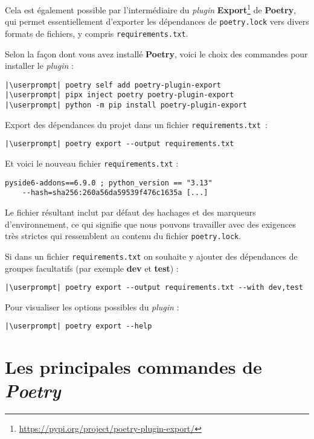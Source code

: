Cela est également possible par l'intermédiaire du \textit{plugin} \textbf{Export}\footnote{\url{https://pypi.org/project/poetry-plugin-export/}} de \textbf{Poetry}, qui permet essentiellement d’exporter les dépendances de \texttt{poetry.lock} vers divers formats de fichiers, y compris \texttt{requirements.txt}.

Selon la façon dont vous avez installé \textbf{Poetry}, voici le choix des commandes pour installer le \textit{plugin} :
\begin{lstlisting}[style=bash]
|\userprompt| poetry self add poetry-plugin-export
|\userprompt| pipx inject poetry poetry-plugin-export
|\userprompt| python -m pip install poetry-plugin-export
\end{lstlisting}

Export des dépendances du projet dans un fichier \texttt{requirements.txt} :
\begin{lstlisting}[style=bash]
|\userprompt| poetry export --output requirements.txt
\end{lstlisting}

Et voici le nouveau fichier \texttt{requirements.txt} :
\begin{lstlisting}[style=file]
pyside6-addons==6.9.0 ; python_version == "3.13" 
    --hash=sha256:260a56da59539f476c1635a [...]
\end{lstlisting}

Le fichier résultant inclut par défaut des hachages et des marqueurs d’environnement, ce qui signifie que nous pouvons travailler avec des exigences très strictes qui ressemblent au contenu du fichier \texttt{poetry.lock}.

Si dans un fichier \texttt{requirements.txt} on souhaite y ajouter des dépendances de groupes facultatifs (par exemple \textbf{dev} et \textbf{test}) :
\begin{lstlisting}[style=bash]
|\userprompt| poetry export --output requirements.txt --with dev,test
\end{lstlisting}

Pour visualiser les options possibles du \textit{plugin} :
\begin{lstlisting}[style=bash]
|\userprompt| poetry export --help
\end{lstlisting}

\section{Les principales commandes de \textit{Poetry}}

